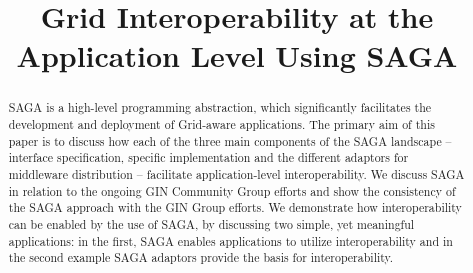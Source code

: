\documentclass[conference,final]{IEEEtran}
\newcommand{\jha}[0]{}
\begin{document}
\title{\LARGE Grid Interoperability at the Application Level Using
  SAGA}

\author{ 
   }


\maketitle

\begin{abstract}\jha
  SAGA is a high-level programming abstraction, which significantly
  facilitates the development and deployment of Grid-aware
  applications. The primary aim of this paper is to discuss how each
  of the three main components of the SAGA landscape -- interface
  specification, specific implementation and the different adaptors
  for middleware distribution -- facilitate application-level
  interoperability. We discuss SAGA in relation to the ongoing GIN
  Community Group efforts and show the consistency of the SAGA
  approach with the GIN Group efforts.  We demonstrate how
  interoperability can be enabled by the use of SAGA, by discussing
  two simple, yet meaningful applications: in the first, SAGA enables
  applications to utilize interoperability and in the second example
  SAGA adaptors provide the basis for interoperability.
\end{abstract}
\end{document}
